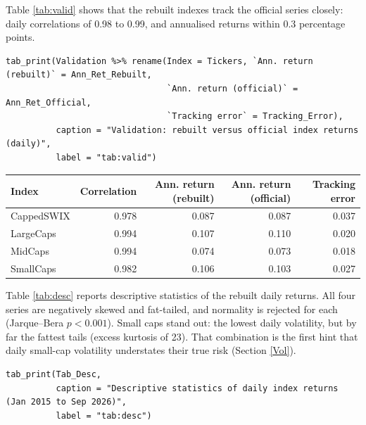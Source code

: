 \documentclass[11pt,preprint]{elsarticle}
\let\origtable\table
\let\endorigtable\endtable
\renewenvironment{table}[1][2] {
    \expandafter\origtable\expandafter[H]
} {
    \endorigtable
}
\numberwithin{equation}{section}
\numberwithin{figure}{section}
\numberwithin{table}{section}
\begin{document}
Table \ref{tab:valid} shows that the rebuilt indexes track the official
series closely: daily correlations of 0.98 to 0.99, and annualised
returns within 0.3 percentage points.

\begin{verbatim}
tab_print(Validation %>% rename(Index = Tickers, `Ann. return (rebuilt)` = Ann_Ret_Rebuilt,
                                `Ann. return (official)` = Ann_Ret_Official,
                                `Tracking error` = Tracking_Error),
          caption = "Validation: rebuilt versus official index returns (daily)",
          label = "tab:valid")
\end{verbatim}

\begin{table}[!htbp]
\centering
\caption{Validation: rebuilt versus official index returns (daily)} 
\label{tab:valid}
\begingroup\footnotesize
\begin{tabular}{lrrrr}
  \hline
Index & Correlation & Ann. return (rebuilt) & Ann. return (official) & Tracking error \\ 
  \hline
CappedSWIX & 0.978 & 0.087 & 0.087 & 0.037 \\ 
  LargeCaps & 0.994 & 0.107 & 0.110 & 0.020 \\ 
  MidCaps & 0.994 & 0.074 & 0.073 & 0.018 \\ 
  SmallCaps & 0.982 & 0.106 & 0.103 & 0.027 \\ 
   \hline
\end{tabular}
\endgroup
\end{table}

Table \ref{tab:desc} reports descriptive statistics of the rebuilt daily
returns. All four series are negatively skewed and fat-tailed, and
normality is rejected for each (Jarque--Bera \(p<0.001\)). Small caps
stand out: the lowest daily volatility, but by far the fattest tails
(excess kurtosis of 23). That combination is the first hint that daily
small-cap volatility understates their true risk (Section \ref{Vol}).

\begin{verbatim}
tab_print(Tab_Desc,
          caption = "Descriptive statistics of daily index returns (Jan 2015 to Sep 2026)",
          label = "tab:desc")
\end{verbatim}
\end{document}
